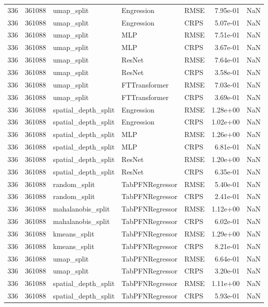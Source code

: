 \begin{tabular}{rrlllrr}
336 & 361088 & umap\_split & Engression & RMSE & 7.95e-01 & NaN \\
336 & 361088 & umap\_split & Engression & CRPS & 5.07e-01 & NaN \\
336 & 361088 & umap\_split & MLP & RMSE & 7.51e-01 & NaN \\
336 & 361088 & umap\_split & MLP & CRPS & 3.67e-01 & NaN \\
336 & 361088 & umap\_split & ResNet & RMSE & 7.64e-01 & NaN \\
336 & 361088 & umap\_split & ResNet & CRPS & 3.58e-01 & NaN \\
336 & 361088 & umap\_split & FTTransformer & RMSE & 7.03e-01 & NaN \\
336 & 361088 & umap\_split & FTTransformer & CRPS & 3.69e-01 & NaN \\
336 & 361088 & spatial\_depth\_split & Engression & RMSE & 1.28e+00 & NaN \\
336 & 361088 & spatial\_depth\_split & Engression & CRPS & 1.02e+00 & NaN \\
336 & 361088 & spatial\_depth\_split & MLP & RMSE & 1.26e+00 & NaN \\
336 & 361088 & spatial\_depth\_split & MLP & CRPS & 6.81e-01 & NaN \\
336 & 361088 & spatial\_depth\_split & ResNet & RMSE & 1.20e+00 & NaN \\
336 & 361088 & spatial\_depth\_split & ResNet & CRPS & 6.35e-01 & NaN \\
336 & 361088 & random\_split & TabPFNRegressor & RMSE & 5.40e-01 & NaN \\
336 & 361088 & random\_split & TabPFNRegressor & CRPS & 2.41e-01 & NaN \\
336 & 361088 & mahalanobis\_split & TabPFNRegressor & RMSE & 1.12e+00 & NaN \\
336 & 361088 & mahalanobis\_split & TabPFNRegressor & CRPS & 6.02e-01 & NaN \\
336 & 361088 & kmeans\_split & TabPFNRegressor & RMSE & 1.29e+00 & NaN \\
336 & 361088 & kmeans\_split & TabPFNRegressor & CRPS & 8.21e-01 & NaN \\
336 & 361088 & umap\_split & TabPFNRegressor & RMSE & 6.64e-01 & NaN \\
336 & 361088 & umap\_split & TabPFNRegressor & CRPS & 3.20e-01 & NaN \\
336 & 361088 & spatial\_depth\_split & TabPFNRegressor & RMSE & 1.11e+00 & NaN \\
336 & 361088 & spatial\_depth\_split & TabPFNRegressor & CRPS & 5.93e-01 & NaN \\

\end{tabular}
